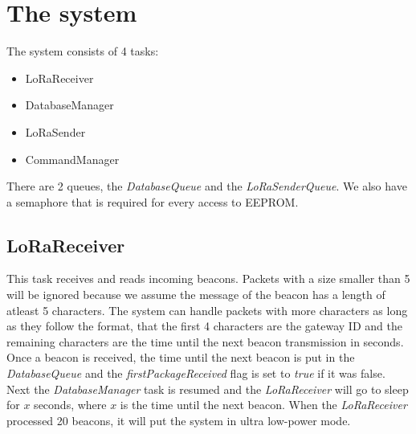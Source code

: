 \documentclass{scrartcl}
\begin{document}


\pagestyle{scrheadings}
\clearscrheadfoot

\cfoot{\pagemark}

\newpage

\section{The system}
The system consists of 4 tasks:
\begin{itemize}
    \item LoRaReceiver
    \item DatabaseManager
    \item LoRaSender
    \item CommandManager
\end{itemize}

There are 2 queues, the \textit{DatabaseQueue} and the \textit{LoRaSenderQueue}.
We also have a semaphore that is required for every access to EEPROM.

\subsection{LoRaReceiver}
This task receives and reads incoming beacons. Packets with a size smaller than 5 will be ignored because
we assume the message of the beacon has a length of atleast 5 characters. The system can handle packets with more characters
as long as they follow the format, that the first 4 characters are the gateway ID and the remaining characters are the time until the
next beacon transmission in seconds. Once a beacon is received, the time until the next beacon is put in the \textit{DatabaseQueue} and
the \textit{firstPackageReceived} flag is set to \textit{true} if it was false. Next the \textit{DatabaseManager} task
is resumed and the \textit{LoRaReceiver} will go to sleep for $x$ seconds, where $x$ is the time until the next beacon.
When the \textit{LoRaReceiver} processed 20 beacons, it will put the system in ultra low-power mode.
\end{document}
